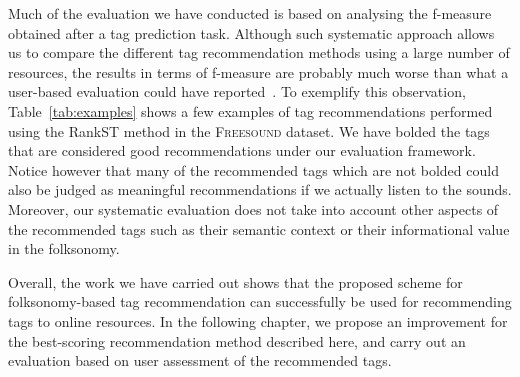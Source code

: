 Much of the evaluation we have conducted is based on analysing the f-measure obtained after a tag prediction task. Although such systematic approach allows us to compare the different tag recommendation methods using a large number of resources, the results in terms of f-measure are probably much worse than what a user-based evaluation could have reported~\citep{Garg2008}. To exemplify this observation, Table~\ref{tab:examples} shows a few examples of tag recommendations performed using the RankST method in the \textsc{Freesound} dataset. We have bolded the tags that are considered good recommendations under our evaluation framework. Notice however that many of the recommended tags which are not bolded could also be judged as meaningful recommendations if we actually listen to the sounds. Moreover, our systematic evaluation does not take into account other aspects of the recommended tags such as their semantic context or their informational value in the folksonomy. 


Overall, the work we have carried out shows that the proposed scheme for folksonomy-based tag recommendation can successfully be used for recommending tags to online resources.
In the following chapter, we propose an improvement for the best-scoring recommendation method described here, and carry out an evaluation based on user assessment of the recommended tags.


